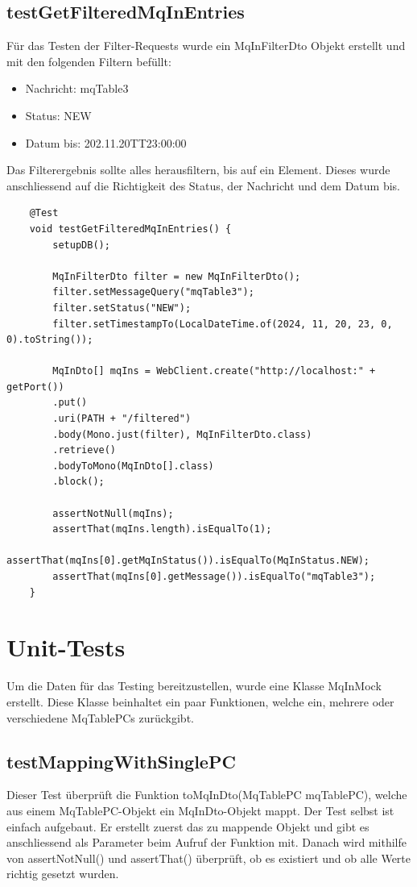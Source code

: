 \subsection{testGetFilteredMqInEntries}
Für das Testen der Filter-Requests wurde ein MqInFilterDto Objekt erstellt und mit den folgenden Filtern befüllt:

\begin{itemize}
	\item Nachricht: mqTable3
	\item Status: NEW
	\item Datum bis: 202.11.20TT23:00:00
\end{itemize}

Das Filterergebnis sollte alles herausfiltern, bis auf ein Element. Dieses wurde anschliessend auf die Richtigkeit des Status, der Nachricht und dem Datum bis.

\begin{verbatim}
	@Test
	void testGetFilteredMqInEntries() {
		setupDB();
		
		MqInFilterDto filter = new MqInFilterDto();
		filter.setMessageQuery("mqTable3");
		filter.setStatus("NEW");
		filter.setTimestampTo(LocalDateTime.of(2024, 11, 20, 23, 0, 0).toString());
		
		MqInDto[] mqIns = WebClient.create("http://localhost:" + getPort())
		.put()
		.uri(PATH + "/filtered")
		.body(Mono.just(filter), MqInFilterDto.class)
		.retrieve()
		.bodyToMono(MqInDto[].class)
		.block();
		
		assertNotNull(mqIns);
		assertThat(mqIns.length).isEqualTo(1);
		assertThat(mqIns[0].getMqInStatus()).isEqualTo(MqInStatus.NEW);
		assertThat(mqIns[0].getMessage()).isEqualTo("mqTable3");
	}
\end{verbatim}

\section{Unit-Tests}
Um die Daten für das Testing bereitzustellen, wurde eine Klasse MqInMock erstellt. Diese Klasse beinhaltet ein paar Funktionen, welche ein, mehrere oder verschiedene MqTablePCs zurückgibt.

\subsection{testMappingWithSinglePC}
Dieser Test überprüft die Funktion toMqInDto(MqTablePC mqTablePC), welche aus einem MqTablePC-Objekt ein MqInDto-Objekt mappt. Der Test selbst ist einfach aufgebaut. Er erstellt zuerst das zu mappende Objekt und gibt es anschliessend als Parameter beim Aufruf der Funktion mit. Danach wird mithilfe von assertNotNull() und assertThat() überprüft, ob es existiert und ob alle Werte richtig gesetzt wurden.

